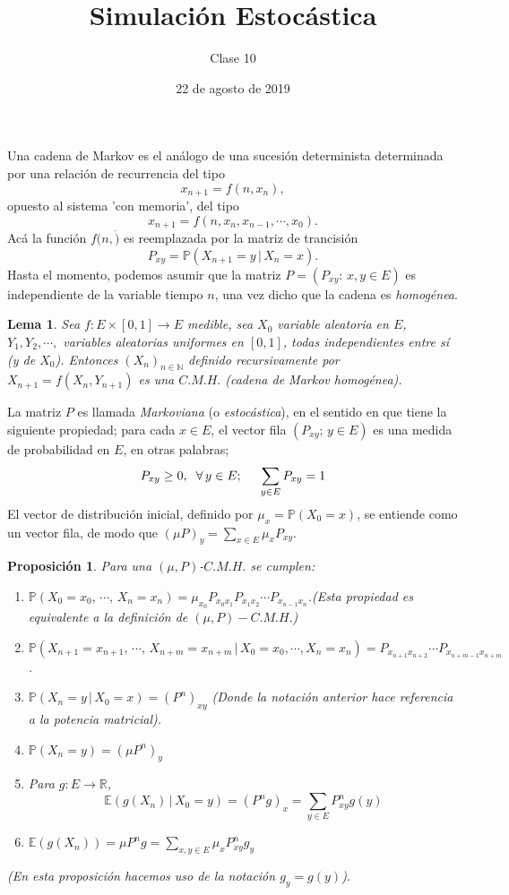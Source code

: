 \documentclass[a4paper]{article}
\title{Simulación Estocástica}
\author{Clase 10}
\date{22 de agosto de 2019}
\newcommand{\prob}{\mathbb{P}}
\newtheorem{lem}{Lema}
\newtheorem{prop}{Proposici\'on}
\numberwithin{equation}{subsection}
\numberwithin{definicion}{subsection}
\def\R{\mathbb R}
\def\N{\mathbb N}
\def\E{\mathbb E}
\begin{document}
\maketitle

Una cadena de Markov es el análogo de una sucesión determinista determinada por una relación de recurrencia del tipo
\[x_{n+1} = f(n,x_n),\]
opuesto al sistema 'con memoria', del tipo
\[x_{n+1} = f(n,x_n,x_{n-1},\cdots,x_0).\]
Acá la función $f(n,\dot)$ es reemplazada por la matriz de trancisión
\[P_{xy}= \prob\left(X_{n+1}=y\,|\,X_n =x\right).\]
Hasta el momento, podemos asumir que la matriz $P=\left(P_{xy}:\,x,y\in E\right)$ es independiente de la variable tiempo $n$, una vez dicho que la cadena es \textit{homogénea}.

\begin{lem}
Sea $f:E\times [0,1]\rightarrow E$ medible, sea $X_0$ variable aleatoria en $E$, $Y_1,Y_2,\cdots,$ variables aleatorias uniformes en $[0,1]$, todas independientes entre sí (y de $X_0$). Entonces $\left(X_n\right)_{n\in\N}$ definido recursivamente por $X_{n+1} = f(X_n,Y_{n+1})$ es una $C.M.H.$ (cadena de Markov homogénea).
\end{lem}
 La matriz $P$ es llamada \textit{Markoviana} (o \textit{estocástica}), en el sentido en que tiene la siguiente propiedad; para cada $x\in E$, el vector fila $\left(P_{xy};\,y\in E\right)$ es una medida de probabilidad en $E$, en otras palabras;
 \[P_{xy}\geq 0,\hspace{0.2cm}\forall\,y\in E;\hspace{0.5cm}\sum_{y\in E}P_{xy} = 1\]
 El vector de distribución inicial, definido por $\mu_x = \prob\left(X_0 = x\right)$, se entiende como un vector fila, de modo que $\left(\mu P\right)_y = \sum_{x\in E}\mu_xP_{xy}$.\\ \newline
 
\begin{prop}
Para una $(\mu,P)$-$C.M.H.$ se cumplen:
\begin{enumerate}
    \item[i)] $\prob\left(X_0=x_0,\,\cdots,\,X_n=x_n\right) = \mu_{x_0}P_{x_0x_1}P_{x_1x_2}\cdots P_{x_{n-1}x_n}$.(Esta propiedad es equivalente a la definición de $(\mu,P)-C.M.H.$)
    \item[ii)] $\prob\left(X_{n+1}=x_{n+1},\,\cdots,\,X_{n+m}=x_{n+m}\,|\,X_0=x_0,\cdots,X_n=x_n\right) = P_{x_{n+1}x_{n+2}}\cdots P_{x_{n+m-1}x_{n+m}}$.
    \item[iii)] $\prob\left(X_n=y\,|\,X_0=x\right) = \left(P^n\right)_{xy}$ (Donde la notación anterior hace referencia a la potencia matricial).
    \item[iv)] $\prob\left(X_n = y\right) = \left(\mu P^n \right)_{y}$
    \item[v)] Para $g:E\rightarrow \R$, 
    \[\E\left(g(X_n)\,|\,X_0 = y\right) = \left(P^ng\right)_x = \sum_{y\in E} P^n_{xy} g(y)\]
    \item[vi)] $\E\left(g(X_n)\right) = \mu P^n g = \sum_{x,y\in E}\mu_x P^n_{xy}g_y$
\end{enumerate}
(En esta proposición hacemos uso de la notación $g_y = g(y)$).
\end{prop}
\end{document}
